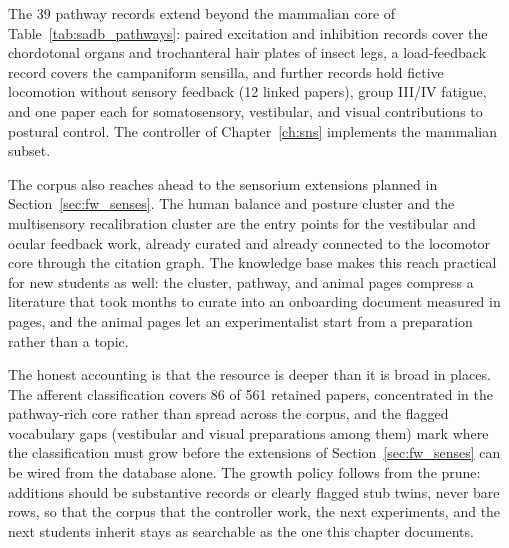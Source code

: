 The 39 pathway records extend beyond the mammalian core of Table~\ref{tab:sadb_pathways}: paired excitation and inhibition records cover the chordotonal organs and trochanteral hair plates of insect legs, a load-feedback record covers the campaniform sensilla, and further records hold fictive locomotion without sensory feedback (12 linked papers), group III/IV fatigue, and one paper each for somatosensory, vestibular, and visual contributions to postural control. The controller of Chapter~\ref{ch:sns} implements the mammalian subset.

The corpus also reaches ahead to the sensorium extensions planned in Section~\ref{sec:fw_senses}. The human balance and posture cluster and the multisensory recalibration cluster are the entry points for the vestibular and ocular feedback work, already curated and already connected to the locomotor core through the citation graph. The knowledge base makes this reach practical for new students as well: the cluster, pathway, and animal pages compress a literature that took months to curate into an onboarding document measured in pages, and the animal pages let an experimentalist start from a preparation rather than a topic.

The honest accounting is that the resource is deeper than it is broad in places. The afferent classification covers 86 of 561 retained papers, concentrated in the pathway-rich core rather than spread across the corpus, and the flagged vocabulary gaps (vestibular and visual preparations among them) mark where the classification must grow before the extensions of Section~\ref{sec:fw_senses} can be wired from the database alone. The growth policy follows from the prune: additions should be substantive records or clearly flagged stub twins, never bare rows, so that the corpus that the controller work, the next experiments, and the next students inherit stays as searchable as the one this chapter documents.

